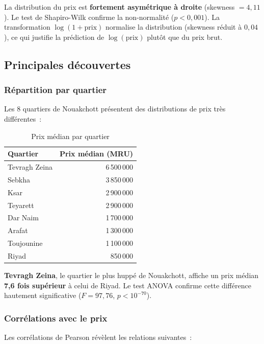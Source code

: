 \documentclass[12pt, a4paper]{article}
\begin{document}
La distribution du prix est \textbf{fortement asymétrique à droite} (skewness $= 4,11$). Le test de Shapiro-Wilk confirme la non-normalité ($p < 0,001$). La transformation $\log(1 + \text{prix})$ normalise la distribution (skewness réduit à $0,04$), ce qui justifie la prédiction de $\log(\text{prix})$ plutôt que du prix brut.

\subsection{Principales découvertes}

\subsubsection{Répartition par quartier}

Les 8 quartiers de Nouakchott présentent des distributions de prix très différentes~:

\begin{table}[H]
\centering
\caption{Prix médian par quartier}
\label{tab:prix_quartier}
\begin{tabular}{lr}
\toprule
\textbf{Quartier} & \textbf{Prix médian (MRU)} \\
\midrule
Tevragh Zeina & 6\,500\,000 \\
Sebkha & 3\,850\,000 \\
Ksar & 2\,900\,000 \\
Teyarett & 2\,900\,000 \\
Dar Naim & 1\,700\,000 \\
Arafat & 1\,300\,000 \\
Toujounine & 1\,100\,000 \\
Riyad & 850\,000 \\
\bottomrule
\end{tabular}
\end{table}

\textbf{Tevragh Zeina}, le quartier le plus huppé de Nouakchott, affiche un prix médian \textbf{7,6 fois supérieur} à celui de Riyad. Le test ANOVA confirme cette différence hautement significative ($F = 97,76$, $p < 10^{-70}$).

\subsubsection{Corrélations avec le prix}

Les corrélations de Pearson révèlent les relations suivantes~:
\end{document}
